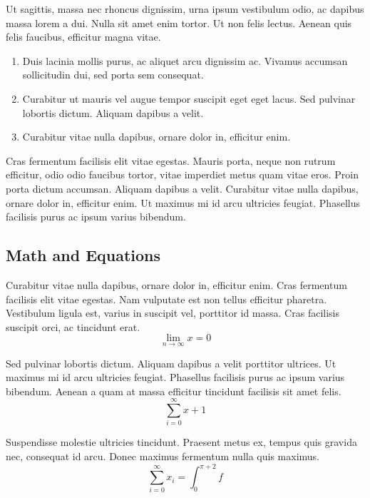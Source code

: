 \documentclass[sigconf, nonacm]{acmart}
\begin{document}
Ut sagittis, massa nec rhoncus dignissim, urna ipsum vestibulum odio, ac dapibus massa lorem a dui. Nulla sit amet enim tortor. Ut non felis lectus. Aenean quis felis faucibus, efficitur magna vitae.

\begin{enumerate}
\item Duis lacinia mollis purus, ac aliquet arcu dignissim ac. Vivamus accumsan sollicitudin dui, sed porta sem consequat.
\item Curabitur ut mauris vel augue tempor suscipit eget eget lacus. Sed pulvinar lobortis dictum. Aliquam dapibus a velit.
\item Curabitur vitae nulla dapibus, ornare dolor in, efficitur enim.
\end{enumerate}

Cras fermentum facilisis elit vitae egestas. Mauris porta, neque non rutrum efficitur, odio odio faucibus tortor, vitae imperdiet metus quam vitae eros. Proin porta dictum accumsan. Aliquam dapibus a velit. Curabitur vitae nulla dapibus, ornare dolor in, efficitur enim. Ut maximus mi id arcu ultricies feugiat. Phasellus facilisis purus ac ipsum varius bibendum.

\subsection{Math and Equations}

Curabitur vitae nulla dapibus, ornare dolor in, efficitur enim. Cras fermentum facilisis elit vitae egestas. Nam vulputate est non tellus efficitur pharetra. Vestibulum ligula est, varius in suscipit vel, porttitor id massa. Cras facilisis suscipit orci, ac tincidunt erat.
\begin{equation}
  \lim_{n\rightarrow \infty}x=0
\end{equation}

Sed pulvinar lobortis dictum. Aliquam dapibus a velit porttitor ultrices. Ut maximus mi id arcu ultricies feugiat. Phasellus facilisis purus ac ipsum varius bibendum. Aenean a quam at massa efficitur tincidunt facilisis sit amet felis.
\begin{displaymath}
  \sum_{i=0}^{\infty} x + 1
\end{displaymath}

Suspendisse molestie ultricies tincidunt. Praesent metus ex, tempus quis gravida nec, consequat id arcu. Donec maximus fermentum nulla quis maximus.
\begin{equation}
  \sum_{i=0}^{\infty}x_i=\int_{0}^{\pi+2} f
\end{equation}
\end{document}
